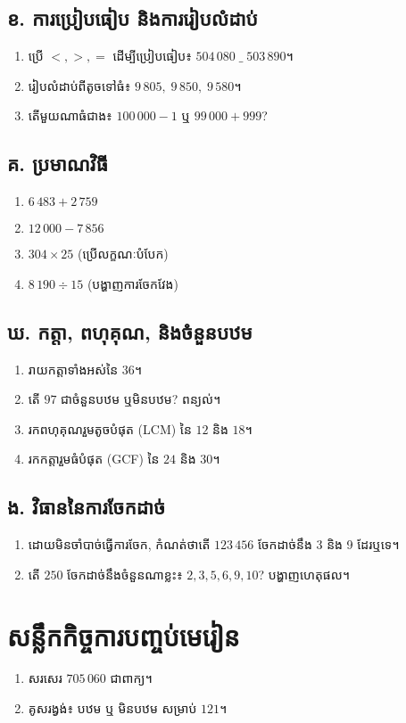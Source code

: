     \subsection*{ខ. ការប្រៀបធៀប និងការរៀបលំដាប់}
    \begin{enumerate}[label=\arabic*.]
        \item ប្រើ $<,>,=$ ដើម្បីប្រៀបធៀប៖ $504\,080\;\_\;503\,890$។
        \item រៀបលំដាប់ពីតូចទៅធំ៖ $9\,805,\;9\,850,\;9\,580$។
        \item តើមួយណាធំជាង៖ $100\,000-1$ ឬ $99\,000+999$?
    \end{enumerate}

    \subsection*{គ. ប្រមាណវិធី}
    \begin{multicols}{2}
        \begin{enumerate}[label=\arabic*.]
            \item $6\,483 + 2\,759$
            \item $12\,000 - 7\,856$
            \item $304\times 25$ (ប្រើលក្ខណៈបំបែក)
            \item $8\,190\div 15$ (បង្ហាញការចែកវែង)
        \end{enumerate}
    \end{multicols}

    \subsection*{ឃ. កត្តា, ពហុគុណ, និងចំនួនបឋម}
    \begin{enumerate}[label=\arabic*.]
        \item រាយកត្តាទាំងអស់នៃ $36$។
        \item តើ $97$ ជាចំនួនបឋម ឬមិនបឋម? ពន្យល់។
        \item រកពហុគុណរួមតូចបំផុត (LCM) នៃ $12$ និង $18$។
        \item រកកត្តារួមធំបំផុត (GCF) នៃ $24$ និង $30$។
    \end{enumerate}

    \subsection*{ង. វិធាននៃការចែកដាច់}
    \begin{enumerate}[label=\arabic*.]
        \item ដោយមិនចាំបាច់ធ្វើការចែក, កំណត់ថាតើ $123\,456$ ចែកដាច់នឹង 3 និង 9 ដែរឬទេ។
        \item តើ $250$ ចែកដាច់នឹងចំនួនណាខ្លះ៖ $2,3,5,6,9,10$? បង្ហាញហេតុផល។
    \end{enumerate}

    \section*{សន្លឹកកិច្ចការបញ្ចប់មេរៀន}
    \begin{enumerate}[label=\arabic*.]
        \item សរសេរ $705\,060$ ជាពាក្យ។
        \item គូសរង្វង់៖ បឋម ឬ មិនបឋម សម្រាប់ $121$។
    \end{enumerate}
